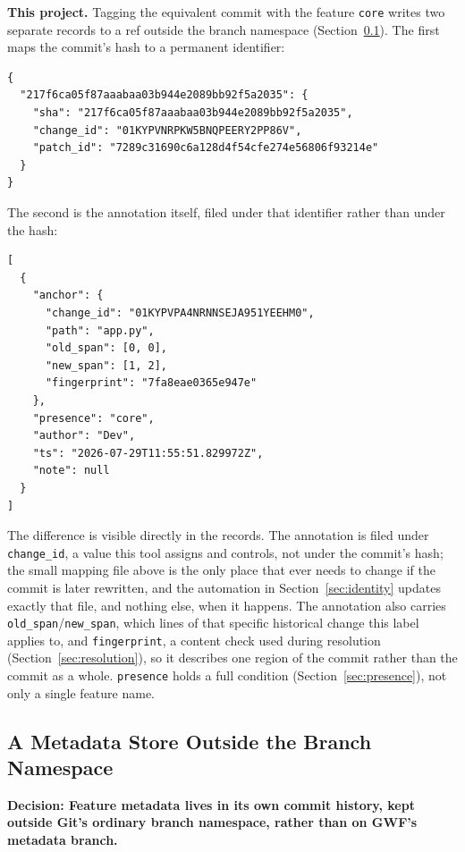 \documentclass[11pt]{article}
\newcommand{\decision}[1]{\medskip\noindent\textbf{Decision: #1}\par\nopagebreak\smallskip}
\begin{document}
\medskip\noindent\textbf{This project.} Tagging the equivalent commit with
the feature \texttt{core} writes two separate records to a ref outside the
branch namespace (Section~\ref{sec:branch-namespace}). The first maps the
commit's hash to a permanent identifier:

\begin{verbatim}
{
  "217f6ca05f87aaabaa03b944e2089bb92f5a2035": {
    "sha": "217f6ca05f87aaabaa03b944e2089bb92f5a2035",
    "change_id": "01KYPVNRPKW5BNQPEERY2PP86V",
    "patch_id": "7289c31690c6a128d4f54cfe274e56806f93214e"
  }
}
\end{verbatim}

The second is the annotation itself, filed under that identifier rather
than under the hash:

\begin{verbatim}
[
  {
    "anchor": {
      "change_id": "01KYPVPA4NRNNSEJA951YEEHM0",
      "path": "app.py",
      "old_span": [0, 0],
      "new_span": [1, 2],
      "fingerprint": "7fa8eae0365e947e"
    },
    "presence": "core",
    "author": "Dev",
    "ts": "2026-07-29T11:55:51.829972Z",
    "note": null
  }
]
\end{verbatim}

The difference is visible directly in the records. The annotation is
filed under \texttt{change\_id}, a value this tool assigns and controls,
not under the commit's hash; the small mapping file above is the only
place that ever needs to change if the commit is later rewritten, and the
automation in Section~\ref{sec:identity} updates exactly that file, and
nothing else, when it happens. The annotation also carries
\texttt{old\_span}/\texttt{new\_span}, which lines of that specific
historical change this label applies to, and \texttt{fingerprint}, a
content check used during resolution (Section~\ref{sec:resolution}), so
it describes one region of the commit rather than the commit as a whole.
\texttt{presence} holds a full condition (Section~\ref{sec:presence}), not
only a single feature name.

\subsection{A Metadata Store Outside the Branch Namespace}
\label{sec:branch-namespace}

\decision{Feature metadata lives in its own commit history, kept outside
Git's ordinary branch namespace, rather than on GWF's metadata branch.}
\end{document}
